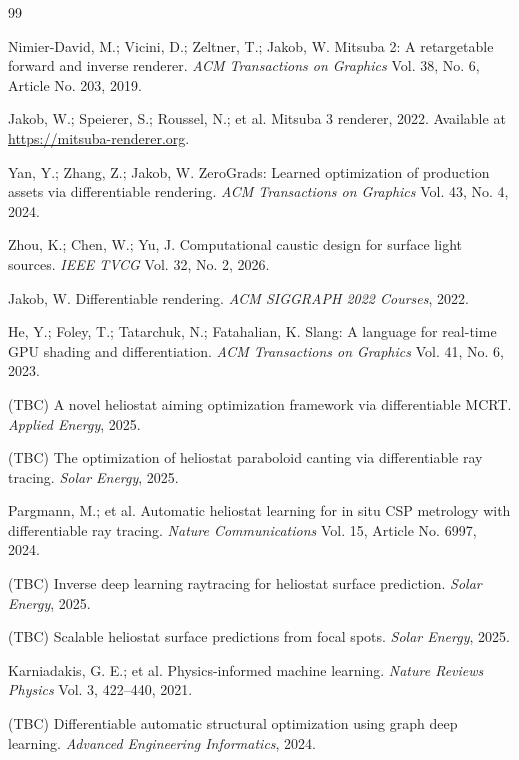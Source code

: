 \documentclass[12pt,a4paper]{ctexart}
\begin{document}
\begin{thebibliography}{99}

Nimier-David, M.; Vicini, D.; Zeltner, T.; Jakob, W.
Mitsuba 2: A retargetable forward and inverse renderer.
\textit{ACM Transactions on Graphics} Vol. 38, No. 6, Article No. 203, 2019.

Jakob, W.; Speierer, S.; Roussel, N.; et al.
Mitsuba 3 renderer, 2022. Available at \url{https://mitsuba-renderer.org}.

Yan, Y.; Zhang, Z.; Jakob, W.
ZeroGrads: Learned optimization of production assets via differentiable rendering.
\textit{ACM Transactions on Graphics} Vol. 43, No. 4, 2024.

Zhou, K.; Chen, W.; Yu, J.
Computational caustic design for surface light sources.
\textit{IEEE TVCG} Vol. 32, No. 2, 2026.

Jakob, W. Differentiable rendering. \textit{ACM SIGGRAPH 2022 Courses}, 2022.

He, Y.; Foley, T.; Tatarchuk, N.; Fatahalian, K.
Slang: A language for real-time GPU shading and differentiation.
\textit{ACM Transactions on Graphics} Vol. 41, No. 6, 2023.

(TBC) A novel heliostat aiming optimization framework via differentiable MCRT.
\textit{Applied Energy}, 2025.

(TBC) The optimization of heliostat paraboloid canting via differentiable ray tracing.
\textit{Solar Energy}, 2025.

Pargmann, M.; et al.
Automatic heliostat learning for in situ CSP metrology with differentiable ray tracing.
\textit{Nature Communications} Vol. 15, Article No. 6997, 2024.

(TBC) Inverse deep learning raytracing for heliostat surface prediction.
\textit{Solar Energy}, 2025.

(TBC) Scalable heliostat surface predictions from focal spots.
\textit{Solar Energy}, 2025.

Karniadakis, G. E.; et al.
Physics-informed machine learning. \textit{Nature Reviews Physics} Vol. 3, 422--440, 2021.

(TBC) Differentiable automatic structural optimization using graph deep learning.
\textit{Advanced Engineering Informatics}, 2024.


\end{thebibliography}
\end{document}
